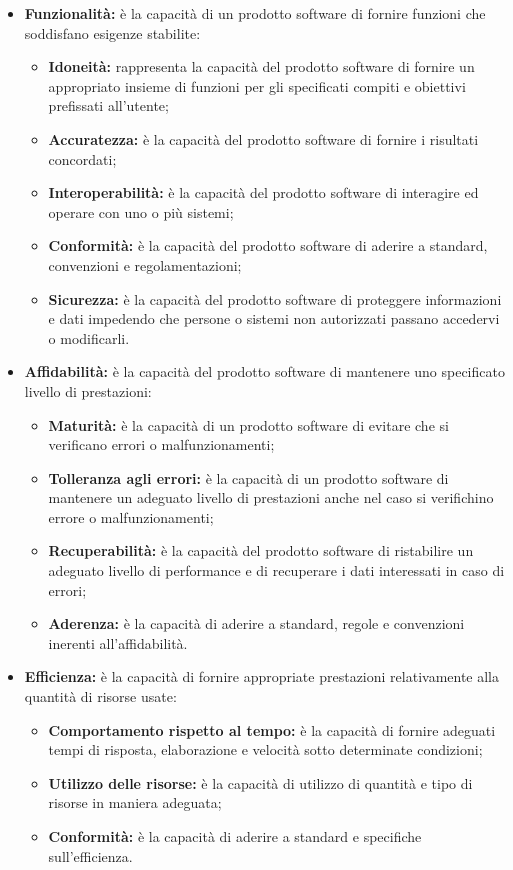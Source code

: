 \begin{itemize}
\item \textbf{Funzionalità:} è la capacità di un prodotto software di fornire funzioni che soddisfano esigenze stabilite:

\begin{itemize}
	\item \textbf{Idoneità:}  rappresenta la capacità del prodotto software di fornire un appropriato insieme di funzioni per gli specificati compiti e obiettivi prefissati all'utente;
	\item \textbf{Accuratezza:} è la capacità del prodotto software di fornire i risultati concordati;
	\item \textbf{Interoperabilità:} è la capacità del prodotto software di interagire ed operare con uno o più sistemi;
	\item \textbf{Conformità:} è la capacità del prodotto software di aderire a standard, convenzioni e regolamentazioni;
	\item \textbf{Sicurezza:} è la capacità del prodotto software di proteggere informazioni e dati impedendo che persone o sistemi non autorizzati passano accedervi o modificarli.
\end{itemize}

\item \textbf{Affidabilità:} è la capacità del prodotto software di mantenere uno specificato livello di prestazioni:
\begin{itemize}
	\item \textbf{Maturità:} è la capacità di un prodotto software di evitare che si verificano errori o malfunzionamenti;
	\item \textbf{Tolleranza agli errori:} è la capacità di un prodotto software di mantenere un adeguato livello di prestazioni anche nel caso si verifichino errore o malfunzionamenti;
	\item \textbf{Recuperabilità:} è la capacità del prodotto software di ristabilire un adeguato livello di performance e di recuperare i dati interessati in caso di errori;
	\item \textbf{Aderenza:} è la capacità di aderire a standard, regole e convenzioni inerenti all'affidabilità.
\end{itemize}

\item \textbf{Efficienza:} è la capacità di fornire appropriate prestazioni relativamente alla quantità di risorse usate:
\begin{itemize}
	\item \textbf{Comportamento rispetto al tempo:} è la capacità di fornire adeguati tempi di risposta, elaborazione e velocità sotto determinate condizioni;
	\item \textbf{Utilizzo delle risorse:} è la capacità di utilizzo di quantità e tipo di risorse in maniera adeguata;
	\item \textbf{Conformità:} è la capacità di aderire a standard e specifiche sull'efficienza.
\end{itemize}


\end{itemize}
